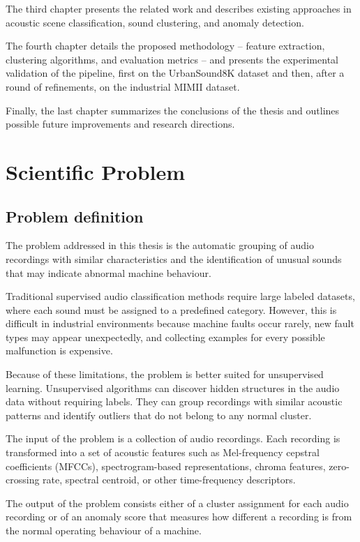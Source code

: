 \documentclass[runningheads,a4paper,11pt]{report}
\begin{document}
The third chapter presents the related work and describes existing approaches in acoustic scene classification, sound clustering, and anomaly detection.

The fourth chapter details the proposed methodology -- feature extraction, clustering algorithms, and evaluation metrics -- and presents the experimental validation of the pipeline, first on the UrbanSound8K dataset and then, after a round of refinements, on the industrial MIMII dataset.

Finally, the last chapter summarizes the conclusions of the thesis and outlines possible future improvements and research directions.

\chapter{Scientific Problem}
\label{section:scientificProblem}

\section{Problem definition}
\label{section:problemDefinition}

The problem addressed in this thesis is the automatic grouping of audio recordings with similar characteristics and the identification of unusual sounds that may indicate abnormal machine behaviour.

Traditional supervised audio classification methods require large labeled datasets, where each sound must be assigned to a predefined category. However, this is difficult in industrial environments because machine faults occur rarely, new fault types may appear unexpectedly, and collecting examples for every possible malfunction is expensive.

Because of these limitations, the problem is better suited for unsupervised learning. Unsupervised algorithms can discover hidden structures in the audio data without requiring labels. They can group recordings with similar acoustic patterns and identify outliers that do not belong to any normal cluster.

The input of the problem is a collection of audio recordings. Each recording is transformed into a set of acoustic features such as Mel-frequency cepstral coefficients (MFCCs), spectrogram-based representations, chroma features, zero-crossing rate, spectral centroid, or other time-frequency descriptors.

The output of the problem consists either of a cluster assignment for each audio recording or of an anomaly score that measures how different a recording is from the normal operating behaviour of a machine.
\end{document}
